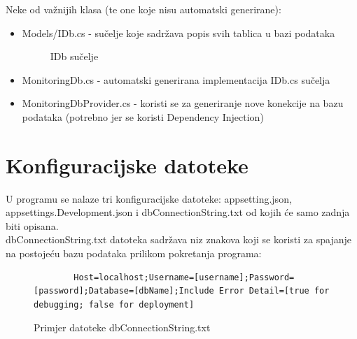 \documentclass[zavrsnirad]{fer}
\begin{document}
Neke od važnijih klasa (te one koje nisu automatski generirane):
\begin{itemize}
	\item Models/IDb.cs - sučelje koje sadržava popis svih tablica u bazi podataka
	\begin{figure}[htb]
		\centering
		
		\caption{IDb sučelje}
	\end{figure}
	\FloatBarrier
	\item MonitoringDb.cs - automatski generirana implementacija IDb.cs sučelja
	\item MonitoringDbProvider.cs - koristi se za generiranje nove konekcije na bazu podataka (potrebno jer se koristi Dependency Injection)
\end{itemize}

\section{Konfiguracijske datoteke}
U programu se nalaze tri konfiguracijske datoteke: appsetting.json, appsettings.Development.json i dbConnectionString.txt od kojih će samo zadnja biti opisana.
\\dbConnectionString.txt datoteka sadržava niz znakova koji se koristi za spajanje na postojeću bazu podataka prilikom pokretanja programa:
\begin{figure}[htb]
	\centering
	\begin{lstlisting}
		Host=localhost;Username=[username];Password=[password];Database=[dbName];Include Error Detail=[true for debugging; false for deployment]
	\end{lstlisting}
	\caption{Primjer datoteke dbConnectionString.txt}
\end{figure}
\FloatBarrier
\end{document}
